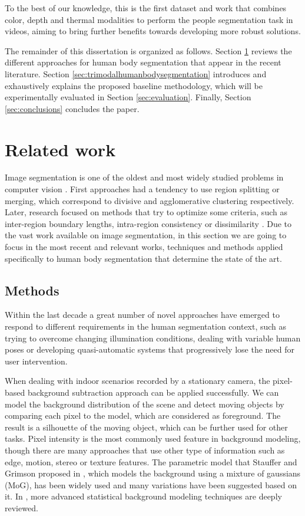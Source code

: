 \documentclass[10pt,twocolumn,letterpaper]{article}
\begin{document}
To the best of our knowledge, this is the first dataset and work that combines color, depth and thermal modalities to perform the people segmentation task in videos, aiming to bring further benefits towards developing more robust solutions.

The remainder of this dissertation is organized as follows. Section \ref{sec:relatedwork} reviews the different approaches for human body segmentation that appear in the recent literature. Section \ref{sec:trimodalhumanbodysegmentation} introduces and exhaustively explains the proposed baseline methodology, which will be experimentally evaluated in Section \ref{sec:evaluation}. Finally, Section \ref{sec:conclusions} concludes the paper.

\section{Related work}
\label{sec:relatedwork}

Image segmentation is one of the oldest and most widely studied problems in computer vision \cite{brice1970scene, riseman1977computational, ohlander1978picture, rosenfeld1979image, haralick1985image}. First approaches had a tendency to use region splitting or merging, which correspond to divisive and agglomerative clustering respectively. Later, research focused on methods that try to optimize some criteria, such as inter-region boundary lengths, intra-region consistency or dissimilarity \cite{szeliski2011computer}. Due to the vast work available on image segmentation, in this section we are going to focus in the most recent and relevant works, techniques and methods applied specifically to human body segmentation that determine the state of the art.

\subsection{Methods}
Within the last decade a great number of novel approaches have emerged to respond to different requirements in the human segmentation context, such as trying to overcome changing illumination conditions, dealing with variable human poses or developing quasi-automatic systems that progressively lose the need for user intervention.
 
 When dealing with indoor scenarios recorded by a stationary camera, the pixel-based background subtraction approach can be applied successfully. We can model the background distribution of the scene and detect moving objects by comparing each pixel to the model, which are considered as foreground. The result is a silhouette of the moving object, which can be further used for other tasks. Pixel intensity is the most commonly used feature in background modeling, though there are many approaches that use other type of information such as edge, motion, stereo or texture features. The parametric model that Stauffer and Grimson proposed in \cite{stauffer1999adaptive}, which models the background using a mixture of gaussians (MoG), has been widely used and many variations have been suggested based on it. In \cite{bouwmans2011recent}, more advanced statistical background modeling techniques are deeply reviewed. 
 
\end{document}
